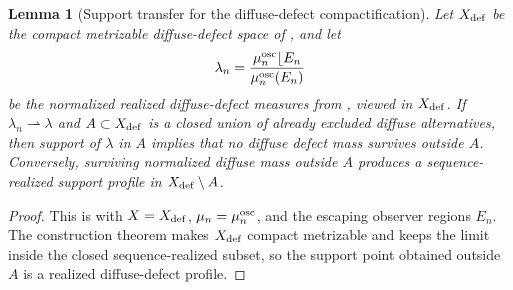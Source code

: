 \documentclass[11pt]{amsart}
\numberwithin{equation}{section}
\theoremstyle{plain}
\newtheorem{lemma}[lemma]{Lemma}
\theoremstyle{definition}
\theoremstyle{remark}
\begin{document}
\begin{lemma}[Support transfer for the diffuse-defect compactification]
\label{lem:diffuse-defect-support-transfer}
Let \(X_{\rm def}\) be the compact metrizable diffuse-defect space of
, and let
\[
   \lambda_n=\frac{\mu_n^{\rm osc}\lfloor E_n}{\mu_n^{\rm osc}(E_n)}
\]
be the normalized realized diffuse-defect measures from
, viewed in \(X_{\rm def}\).  If
\(\lambda_n\rightharpoonup\lambda\) and \(A\subset X_{\rm def}\) is a closed
union of already excluded diffuse alternatives, then support of \(\lambda\) in
\(A\) implies that no diffuse defect mass survives outside \(A\).  Conversely,
surviving normalized diffuse mass outside \(A\) produces a sequence-realized
support profile in \(X_{\rm def}\setminus A\).
\end{lemma}

\begin{proof}
This is  with
\(X=X_{\rm def}\), \(\mu_n=\mu_n^{\rm osc}\), and the escaping observer
regions \(E_n\).  The construction theorem makes \(X_{\rm def}\) compact
metrizable and keeps the limit inside the closed sequence-realized subset, so
the support point obtained outside \(A\) is a realized diffuse-defect profile.
\end{proof}
\end{document}
